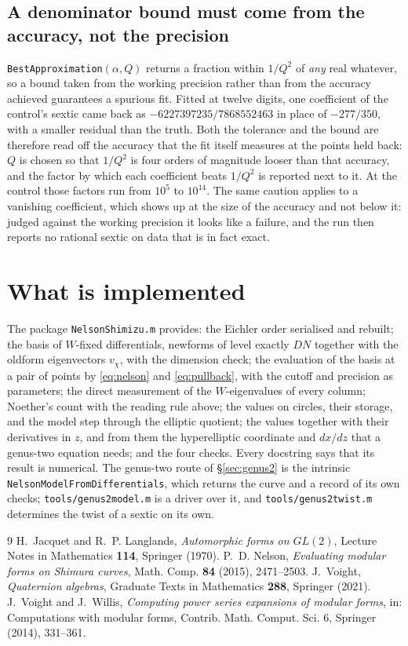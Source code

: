 \documentclass[11pt,reqno]{amsart}
\theoremstyle{plain}
\theoremstyle{definition}
\begin{document}
\subsection*{A denominator bound must come from the accuracy, not the precision}
\texttt{BestApproximation}$(\alpha,Q)$ returns a fraction within $1/Q^{2}$ of \emph{any} real
whatever, so a bound taken from the working precision rather than from the accuracy achieved
guarantees a spurious fit. Fitted at twelve digits, one coefficient of the control's sextic came
back as $-6227397235/7868552463$ in place of $-277/350$, with a smaller residual than the truth.
Both the tolerance and the bound are therefore read off the accuracy that the fit itself measures
at the points held back: $Q$ is chosen so that $1/Q^{2}$ is four orders of magnitude looser than
that accuracy, and the factor by which each coefficient beats $1/Q^{2}$ is reported next to it. At
the control those factors run from $10^{5}$ to $10^{14}$. The same caution applies to a vanishing
coefficient, which shows up at the size of the accuracy and not below it: judged against the
working precision it looks like a failure, and the run then reports no rational sextic on data that
is in fact exact.

\section{What is implemented}

The package \texttt{NelsonShimizu.m} provides: the Eichler order serialised and rebuilt; the
basis of $W$-fixed differentials, newforms of level exactly $DN$ together with the oldform
eigenvectors $v_\chi$, with the dimension check; the evaluation of the basis at a pair of points
by \eqref{eq:nelson} and \eqref{eq:pullback}, with the cutoff and precision as parameters; the
direct measurement of the $W$-eigenvalues of every column; Noether's count with the reading rule
above; the values on circles, their storage, and the model step through the elliptic quotient;
the values together with their derivatives in $z$, and from them the hyperelliptic coordinate and
$dx/dz$ that a genus-two equation needs; and the four checks. Every docstring says that its result
is numerical. The genus-two route of \S\ref{sec:genus2} is the intrinsic \texttt{NelsonModelFromDifferentials},
which returns the curve and a record of its own checks; \texttt{tools/genus2model.m} is a driver
over it, and \texttt{tools/genus2twist.m} determines the twist of a sextic on its own.

\begin{thebibliography}{9}
 H.~Jacquet and R.~P. Langlands, \emph{Automorphic forms on $GL(2)$}, Lecture Notes
in Mathematics \textbf{114}, Springer (1970).
 P.~D. Nelson, \emph{Evaluating modular forms on Shimura curves}, Math. Comp.
\textbf{84} (2015), 2471--2503.
 J.~Voight, \emph{Quaternion algebras}, Graduate Texts in Mathematics
\textbf{288}, Springer (2021).
 J.~Voight and J.~Willis, \emph{Computing power series expansions of modular forms},
in: Computations with modular forms, Contrib. Math. Comput. Sci. 6, Springer (2014), 331--361.
\end{thebibliography}
\end{document}
